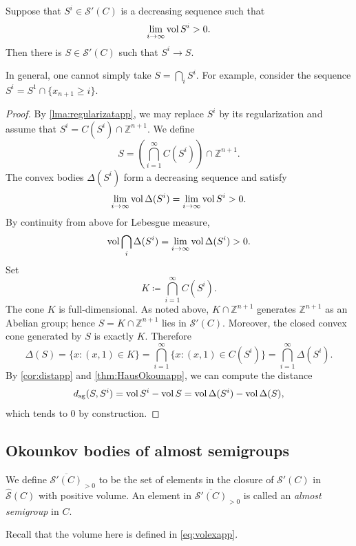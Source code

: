 \begin{lemma}\label{lma:Sprimeintapp}
    Suppose that $S^i\in \mathcal{S}'(C)$ is a decreasing sequence such that
    \[
    \lim_{i\to\infty}\operatorname{vol} S^i>0.
    \]
    Then there is $S\in \mathcal{S}'(C)$ such that $S^i\to S$.
\end{lemma}
In general, one cannot simply take $S=\bigcap_i S^i$. For example, consider the sequence $S^i=S^1\cap \{x_{n+1}\geq i\}$.
\begin{proof}
    By \cref{lma:regularizatapp}, we may replace $S^i$ by its regularization and assume that $S^i=C(S^i)\cap \mathbb{Z}^{n+1}$. We define
    \[
    S=\left( \bigcap_{i=1}^{\infty}C(S^i) \right) \cap \mathbb{Z}^{n+1}.
    \]
    The convex bodies $\Delta(S^i)$ form a decreasing sequence and satisfy
    \[
    \lim_{i\to\infty}\operatorname{vol}\Delta(S^i)=\lim_{i\to\infty}\operatorname{vol} S^i>0.
    \]
    By continuity from above for Lebesgue measure,
    \[
    \operatorname{vol}\bigcap_i\Delta(S^i)=\lim_{i\to\infty}\operatorname{vol}\Delta(S^i)>0.
    \]
    Set
    \[
        K\coloneqq \bigcap_{i=1}^{\infty}C(S^i).
    \]
    The cone $K$ is full-dimensional. As noted above, $K\cap\mathbb Z^{n+1}$ generates $\mathbb Z^{n+1}$ as an Abelian group; hence $S=K\cap\mathbb Z^{n+1}$ lies in $\mathcal S'(C)$. Moreover, the closed convex cone generated by $S$ is exactly $K$. Therefore
    \[
        \Delta(S)=\{x:(x,1)\in K\}=\bigcap_{i=1}^{\infty}\{x:(x,1)\in C(S^i)\}=\bigcap_{i=1}^{\infty}\Delta(S^i).
    \]
    By \cref{cor:distapp} and \cref{thm:HausOkounapp}, we can compute the distance
    \[
    d_{\mathrm{sg}}(S,S^i)=\operatorname{vol} S^i-\operatorname{vol} S=\operatorname{vol} \Delta (S^i)-\operatorname{vol} \Delta (S),
    \]
    which tends to $0$ by construction.
\end{proof}

\subsection{Okounkov bodies of almost semigroups}\label{subsec:Okobalmosgapp}
\begin{definition}\label{def:SpCbarapp}
    We define $\overline{\mathcal{S}'(C)}_{>0}$ to be the set of elements in the closure of $\mathcal{S}'(C)$ in $\hat{\mathcal{S}}(C)$ with positive volume. An element in $\overline{\mathcal{S}'(C)}_{>0}$ is called an \emph{almost semigroup} in $C$.
\end{definition}
Recall that the volume here is defined in \eqref{eq:volexapp}.

